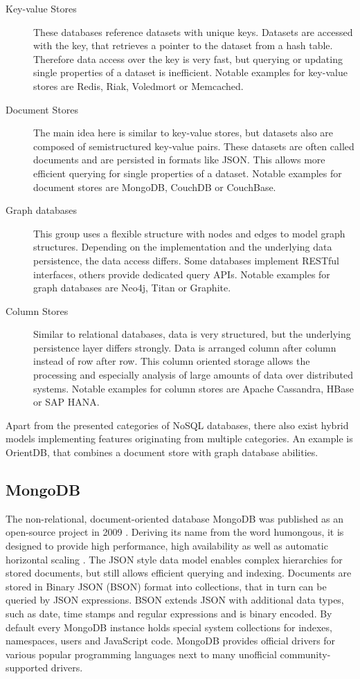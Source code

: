 \begin{description}
\item [Key-value Stores] These databases reference datasets with unique keys. Datasets are accessed with the key, that retrieves a pointer to the dataset from a hash table. Therefore data access over the key is very fast, but querying or updating single properties of a dataset is inefficient. Notable examples for key-value stores are Redis, Riak, Voledmort or Memcached.
\item [Document Stores] The main idea here is similar to key-value stores, but datasets also are composed of semistructured key-value pairs. These datasets are often called documents and are persisted in formats like JSON. This allows more efficient querying for single properties of a dataset. Notable examples for document stores are MongoDB, CouchDB or CouchBase.
\item [Graph databases] This group uses a flexible structure with nodes and edges to model graph structures. Depending on the implementation and the underlying data persistence, the data access differs. Some databases implement RESTful interfaces, others provide dedicated query APIs. Notable examples for graph databases are Neo4j, Titan or Graphite.
\item [Column Stores] Similar to relational databases, data is very structured, but the underlying persistence layer differs strongly. Data is arranged column after column instead of row after row. This column oriented storage allows the processing and especially analysis of large amounts of data over distributed systems. Notable examples for column stores are Apache Cassandra, HBase or SAP HANA.
\end{description}

Apart from the presented categories of NoSQL databases, there also exist hybrid models implementing features originating from multiple categories. An example is OrientDB, that combines a document store with graph database abilities. 

\subsection{MongoDB}
The non-relational, document-oriented database MongoDB was published as an open-source project in 2009 \cite{Eliot:2010}. Deriving its name from the word humongous, it is designed to provide high performance, high availability as well as automatic horizontal scaling \cite{MongoDB_Intro:2016}. The JSON style data model enables complex hierarchies for stored documents, but still allows efficient querying and indexing. Documents are stored in Binary JSON (BSON) format into collections, that in turn can be queried by JSON expressions. BSON extends JSON with additional data types, such as date, time stamps and regular expressions and is binary encoded. By default every MongoDB instance holds special system collections for indexes, namespaces, users and JavaScript code. MongoDB provides official drivers for various popular programming languages next to many unofficial community-supported drivers. 

